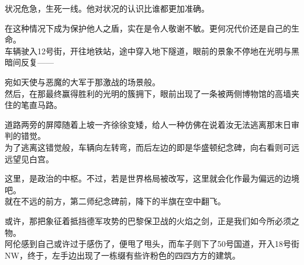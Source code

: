 状况危急，生死一线。他对状况的认识比谁都更加准确。

在这种情况下成为保护他人之盾，实在是令人敬谢不敏。更何况代价还是自己的生命。\\

车辆驶入12号街，开往地铁站，途中穿入地下隧道，眼前的景象不停地在光明与黑暗间反复——

宛如天使与恶魔的大军于那激战的场景般。\\

然后，在那最终赢得胜利的光明的簇拥下，眼前出现了一条被两侧博物馆的高墙夹住的笔直马路。

道路两旁的屏障随着上坡一齐徐徐变矮，给人一种仿佛在说着汝无法逃离那末日审判的错觉。\\

为了逃离这错觉般，车辆向左转弯，而后左边的即是华盛顿纪念碑，向右看则可远远望见白宫。

这里，是政治的中枢。不过，若是世界格局被改写，这里就会化作最为偏远的边境吧。\\

就在不远的前方，第二师纪念碑前，降下的半旗在空中翻飞。

或许，那把象征着抵挡德军攻势的巴黎保卫战的火焰之剑，正是我们如今所必须之物。\\

阿伦感到自己或许过于感伤了，便甩了甩头，而车子则下了50号国道，开入18号街NW，终于，左手边出现了一栋缀有些许粉色的四四方方的建筑。

